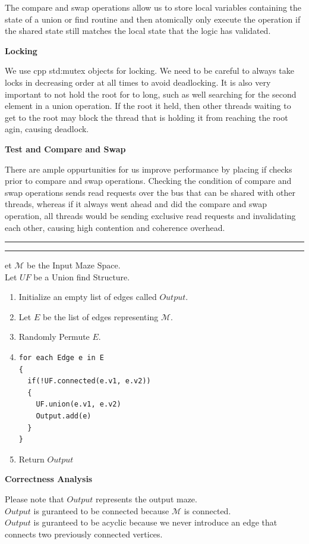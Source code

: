 \documentclass[11pt]{article}
\newcommand{\question}[2] {\vspace{.25in} \hrule\vspace{0.5em}
\noindent{\bf #1: #2} \vspace{0.5em}
\hrule \vspace{.10in}}
\begin{document}
The compare and swap operations allow us to store local variables containing the state of a union or find routine and then atomically only execute the operation if the shared state still matches the local state that the logic has validated.

\textbf{Locking}

We use cpp std:mutex objects for locking. We need to be careful to always take locks in decreasing order at all times to avoid deadlocking. It is also very important to not hold the root for to long, such as well searching for the second element in a union operation. If the root it held, then other threads waiting to get to the root may block the thread that is holding it from reaching the root agin, causing deadlock.

\textbf{Test and Compare and Swap}

There are ample oppurtunities for us improve performance by placing if checks prior to compare and swap operations. Checking the condition of compare and swap operations sends read requests over the bus that can be shared with other threads, whereas if it always went ahead and did the compare and swap operation, all threads would be sending exclusive read requests and invalidating each other, causing high contention and coherence overhead.

\newpage

\question{Serial Maze Construction Algorithm}

Let $\mathcal{M}$ be the Input Maze Space.\\
Let $UF$ be a Union find Structure.\\

\begin{enumerate}[1.]

\item Initialize an empty list of edges called $Output$.
\item Let $E$ be the list of edges representing $\mathcal{M}$.
\item Randomly Permute $E$.
\item
\begin{verbatim}
for each Edge e in E
{
  if(!UF.connected(e.v1, e.v2))
  {
    UF.union(e.v1, e.v2)
    Output.add(e)
  }
}
\end{verbatim}
\item Return $Output$
\end{enumerate}

\textbf{Correctness Analysis}

Please note that $Output$ represents the output maze.\\
$Output$ is guranteed to be connected because $\mathcal{M}$ is connected.\\
$Output$ is guranteed to be acyclic because we never introduce an edge that connects two previously connected vertices.
\end{document}

